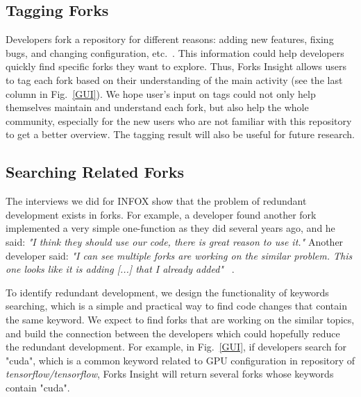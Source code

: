 \subsection{Tagging Forks}
%
Developers fork a repository for different reasons: adding new features, fixing bugs, and changing configuration, etc.~\cite{Mikkonen2011,Robles2012,dubinsky2013exploratory,stanciulescu2015forked}. This information could help developers quickly find specific forks they want to explore. Thus, Forks Insight allows users to tag each fork based on their understanding of the main activity (see the last column in Fig.~\ref{GUI}). We hope user's input on tags could not only help themselves maintain and understand each fork, but also help the whole community, especially for the new users who are not familiar with this repository to get a better overview. The tagging result will also be useful for future research.


\subsection{Searching Related Forks}

The interviews we did for INFOX show that the problem of redundant development exists in forks. For example, a developer found another fork implemented a very simple one-function as they did several years ago, and he said: \emph{"I think they should use our code, there is great reason to use it."} Another developer said: \emph{"I can see multiple forks are working on the similar problem. This one looks like it is adding [...] that I already added"} ~\cite{ZSLXWK:ICSE18}.

To identify redundant development, we design the functionality of keywords searching, which is a simple and practical way to find code changes that contain the same keyword. We expect to find forks that are working on the similar topics, and build the connection between the developers which could hopefully reduce the redundant development. For example, in Fig.~\ref{GUI}, if developers search for "cuda", which is a common keyword related to GPU configuration in repository of \emph{tensorflow/tensorflow}, Forks Insight will return several forks whose keywords contain "cuda".
\iffalse
\begin{figure}[H] 
\centering
\texttt{[image: shot2.png]}
\caption{An example of searching for similar forks.}
\vspace{-10pt}

\end{figure}
\fi

